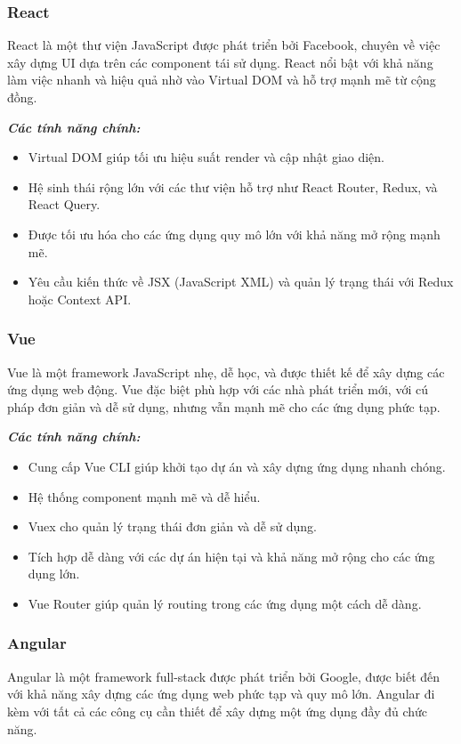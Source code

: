 \subsubsection{React}
React là một thư viện JavaScript được phát triển bởi Facebook, chuyên về việc xây dựng UI dựa trên các component tái sử dụng. React nổi bật với khả năng làm việc nhanh và hiệu quả nhờ vào Virtual DOM và hỗ trợ mạnh mẽ từ cộng đồng.

\par \textbf{\textit{Các tính năng chính:}} \begin{itemize} \item Virtual DOM giúp tối ưu hiệu suất render và cập nhật giao diện. \item Hệ sinh thái rộng lớn với các thư viện hỗ trợ như React Router, Redux, và React Query. \item Được tối ưu hóa cho các ứng dụng quy mô lớn với khả năng mở rộng mạnh mẽ. \item Yêu cầu kiến thức về JSX (JavaScript XML) và quản lý trạng thái với Redux hoặc Context API. \end{itemize}

\subsubsection{Vue}
Vue là một framework JavaScript nhẹ, dễ học, và được thiết kế để xây dựng các ứng dụng web động. Vue đặc biệt phù hợp với các nhà phát triển mới, với cú pháp đơn giản và dễ sử dụng, nhưng vẫn mạnh mẽ cho các ứng dụng phức tạp.

\par \textbf{\textit{Các tính năng chính:}} \begin{itemize} \item Cung cấp Vue CLI giúp khởi tạo dự án và xây dựng ứng dụng nhanh chóng. \item Hệ thống component mạnh mẽ và dễ hiểu. \item Vuex cho quản lý trạng thái đơn giản và dễ sử dụng. \item Tích hợp dễ dàng với các dự án hiện tại và khả năng mở rộng cho các ứng dụng lớn. \item Vue Router giúp quản lý routing trong các ứng dụng một cách dễ dàng. \end{itemize}

\subsubsection{Angular}
Angular là một framework full-stack được phát triển bởi Google, được biết đến với khả năng xây dựng các ứng dụng web phức tạp và quy mô lớn. Angular đi kèm với tất cả các công cụ cần thiết để xây dựng một ứng dụng đầy đủ chức năng.

